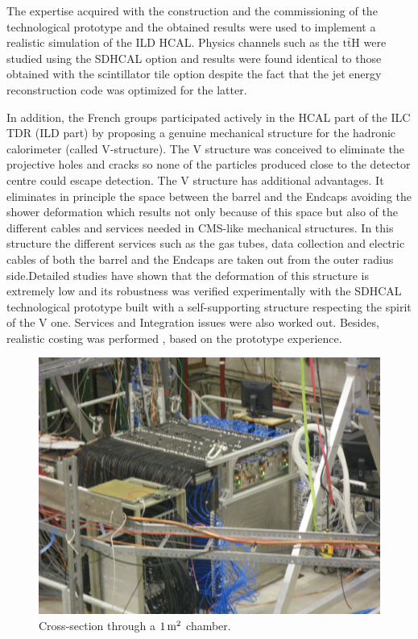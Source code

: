 The expertise acquired with the construction and
the commissioning of the technological prototype and the obtained results were
used to implement a realistic simulation of the ILD HCAL. Physics channels such
as the $\mathrm{t} \bar{\mathrm{t}}\mathrm{H}$ were studied using the SDHCAL option and results were found
identical to those obtained with the scintillator tile option despite the fact
that the jet energy reconstruction code was optimized for the latter.

In addition, the French groups participated actively in the HCAL part of the
ILC TDR (ILD part) by proposing a genuine mechanical structure for the hadronic
calorimeter (called V-structure). The V structure was conceived to eliminate
the projective holes and cracks so none of the particles produced close to the
detector centre could escape detection. The V structure has additional
advantages. It eliminates in principle the space between the barrel and the
Endcaps avoiding the shower deformation which results not only because of
this space but also of the different cables and services needed in CMS-like
mechanical structures. In this structure the different services such as the
gas tubes, data collection and electric cables of both the barrel and the
Endcaps are taken out from the outer radius side.Detailed studies have shown
that the deformation of this structure is extremely low and its robustness was
verified experimentally with the SDHCAL technological prototype built with a
self-supporting structure respecting the spirit of the V one. Services and
Integration issues were also worked out. Besides, realistic costing was
performed , based on the prototype experience.

\begin{figure}
\centering
\includegraphics[width=0.50\columnwidth]{Calorimeter/SDHCAL_GRPC/figures/prototype.JPG}
\caption{Cross-section through a $\unit[1]{m^2}$ chamber.}
\label{fig:Calorimeter:SDHCAL_GRPC:prototype}
\end{figure}

